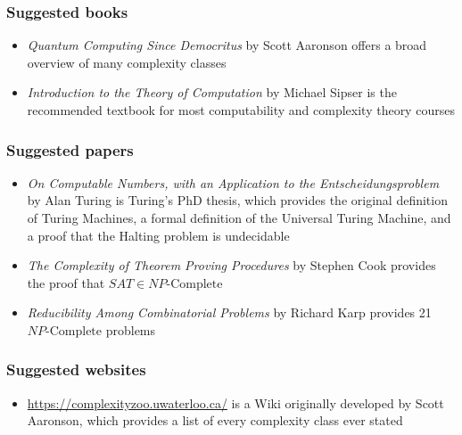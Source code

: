 \documentclass[aspectratio=169]{beamer}
\begin{document}
\begin{frame}
\frametitle{Suggested books}
\begin{itemize}
	\item {\em Quantum Computing Since Democritus} by Scott Aaronson offers a broad overview of many complexity classes
	\item {\em Introduction to the Theory of Computation} by Michael Sipser is the recommended textbook for most computability and complexity theory courses
\end{itemize}
\end{frame}

\begin{frame}
\frametitle{Suggested papers}
\begin{itemize}
	\item {\em On Computable Numbers, with an Application to the Entscheidungsproblem} by Alan Turing is Turing's PhD thesis, which provides the original definition of Turing Machines, a formal definition of the Universal Turing Machine, and a proof that the Halting problem is undecidable
	\item {\em The Complexity of Theorem Proving Procedures} by Stephen Cook provides the proof that $SAT \in NP\text{-Complete}$
	\item {\em Reducibility Among Combinatorial Problems} by Richard Karp provides 21 $NP\text{-Complete}$ problems
\end{itemize}
\end{frame}

\begin{frame}
\frametitle{Suggested websites}
\begin{itemize}
	\item \url{https://complexityzoo.uwaterloo.ca/} is a Wiki originally developed by Scott Aaronson, which provides a list of every complexity class ever stated
\end{itemize}
\end{frame}

\end{document}
